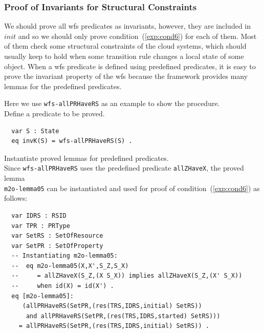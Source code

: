 \documentclass[12pt]{report}
\begin{document}
\subsubsection*{Proof of Invariants for Structural Constraints}
We should prove all wfs predicates as invariants, however, they are
included in $init$ and so we should only prove
condition~(\ref{exp:cond6}) for each of them. Most of them check some
structural constraints of the cloud systems, which should usually keep
to hold when some transition rule changes a local state of some
object. When a wfs predicate is defined using predefined predicates, it
is easy to prove the invariant property of the wfs because the framework
provides many lemmas for the predefined predicates.

Here we use {\tt wfs-allPRHaveRS} as an example to show the procedure.\\

 Define a predicate to be proved. 
\small
\begin{verbatim}
  var S : State
  eq invK(S) = wfs-allPRHaveRS(S) .
\end{verbatim}
\normalsize

 Instantiate proved lemmas for predefined
predicates. \\ Since {\tt wfs-allPRHaveRS} uses the predefined
predicate {\tt allZHaveX}, the proved lemma \\ {\tt m2o-lemma05} can be
instantiated and used for proof of condition~(\ref{exp:cond6}) as
follows:
\small
\begin{verbatim}
  var IDRS : RSID 
  var TPR : PRType
  var SetRS : SetOfResource
  var SetPR : SetOfProperty
  -- Instantiating m2o-lemma05:
  --  eq m2o-lemma05(X,X',S_Z,S_X) 
  --     = allZHaveX(S_Z,(X S_X)) implies allZHaveX(S_Z,(X' S_X))
  --     when id(X) = id(X') .
  eq [m2o-lemma05]:
     (allPRHaveRS(SetPR,(res(TRS,IDRS,initial) SetRS))
      and allPRHaveRS(SetPR,(res(TRS,IDRS,started) SetRS)))
    = allPRHaveRS(SetPR,(res(TRS,IDRS,initial) SetRS)) .
\end{verbatim}
\normalsize
\end{document}
